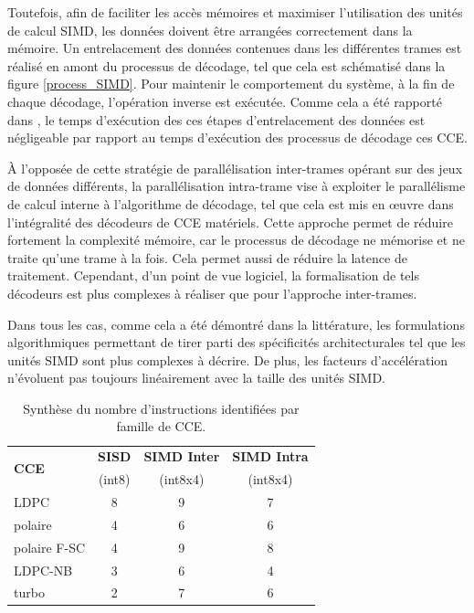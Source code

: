 \documentclass[../main.tex]{subfiles}
\begin{document}
Toutefois, afin de faciliter les accès mémoires et maximiser l'utilisation des unités de calcul SIMD, les données doivent être arrangées correctement dans la mémoire. 
Un entrelacement des données contenues dans les différentes trames est réalisé en amont du processus de décodage, tel que cela est schématisé dans la figure \ref{process_SIMD}. 
Pour maintenir le comportement du système, à la fin de chaque décodage, l'opération inverse est exécutée. 
Comme cela a été rapporté dans \cite{LDPC:SOFT4}, le temps d'exécution des ces étapes d'entrelacement des données est négligeable par rapport au temps d'exécution des processus de décodage ces CCE.

À l'opposée de cette stratégie de parallélisation inter-trames opérant sur des jeux de données différents, la parallélisation intra-trame vise à exploiter le parallélisme de calcul interne à l'algorithme de décodage, tel que cela est mis en œuvre dans l'intégralité des décodeurs de CCE matériels. 
Cette approche permet de réduire fortement la complexité mémoire, car le processus de décodage ne mémorise et ne traite qu'une trame à la fois. 
Cela permet aussi de réduire la latence de traitement. 
Cependant, d'un point de vue logiciel, la formalisation de tels décodeurs est plus complexes à réaliser que pour l'approche inter-trames.

Dans tous les cas, comme cela a été démontré dans la littérature, les formulations algorithmiques permettant de tirer parti des spécificités architecturales tel que les unités SIMD sont plus complexes à décrire. 
De plus, les facteurs d'accélération n'évoluent pas toujours linéairement avec la taille des unités SIMD.



\begin{table}
    \centering
    \footnotesize
    \begin{tabular}{lccc}
        \toprule
        \multirow{2}{*}{\textbf{CCE}}&  \textbf{SISD} & \textbf{SIMD Inter} & \textbf{SIMD Intra}     \\
                            & (int8)&(int8x4)   & (int8x4)      \\
        \toprule
        LDPC                & 8     & 9         & 7             \\
        \cmidrule(l){2-4}
        polaire             & 4     & 6         & 6             \\
        \cmidrule(l){2-4}
        polaire F-SC        & 4     & 9         & 8             \\
        \cmidrule(l){2-4}
        LDPC-NB             & 3     & 6         & 4             \\
        \cmidrule(l){2-4}
        turbo               & 2     &  7        & 6             \\
        \bottomrule
    \end{tabular}
    \caption{Synthèse du nombre d'instructions identifiées par famille de CCE.}
    \label{sum:all:instr}
\end{table}
\end{document}
